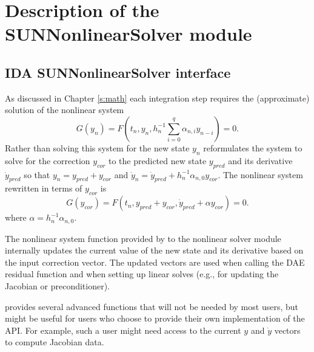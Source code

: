 \chapter{Description of the SUNNonlinearSolver module}\label{c:sunnonlinsol}


\section{IDA SUNNonlinearSolver interface}
\label{s:sunnonlinsol_interface}

As discussed in Chapter \ref{s:math} each integration step requires the
(approximate) solution of the nonlinear system
\begin{equation}
  G(y_n) = F\left(t_n, y_n, h_{n}^{-1}\sum_{i=0}^{q}\alpha_{n,i}y_{n-i}\right) = 0.
\end{equation}
Rather than solving this system for the new state $y_n$ {\ida} reformulates the
system to solve for the correction $y_{cor}$ to the predicted new state $y_{pred}$
and its derivative $\dot{y}_{pred}$ so that $y_n = y_{pred} + y_{cor}$ and
$\dot{y}_n = \dot{y}_{pred} + h_{n}^{-1} \alpha_{n,0} y_{cor}$. The nonlinear
system rewritten in terms of $y_{cor}$ is
\begin{equation}
  G(y_{cor}) = F\left(t_n, y_{pred}+y_{cor},
  \dot{y}_{pred} + \alpha y_{cor}\right) = 0.
\end{equation}
where $\alpha = h_{n}^{-1} \alpha_{n,0}$.

The nonlinear system function provided by {\ida} to the nonlinear solver module
internally updates the current value of the new state and its derivative based
on the input correction vector. The updated vectors are used when calling the
DAE residual function and when setting up linear solves (e.g., for updating the
Jacobian or preconditioner).

{\ida} provides several advanced functions that will not be needed by most users,
but might be useful for users who choose to provide their own implementation of
the  API. For example, such a user might need access to
the current $y$ and $\dot{y}$ vectors to compute Jacobian data.

